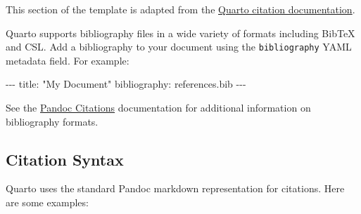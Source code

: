\documentclass[
  letterpaper,
  12pt,
  oneside,
  spanish,
  doublespacing,
  headsepline,
  parskip]{MastersDoctoralThesis}
\newenvironment{Shaded}{\begin{snugshade}}{\end{snugshade}}
\newcommand{\AttributeTok}[1]{\textcolor[rgb]{0.40,0.45,0.13}{#1}}
\newcommand{\FunctionTok}[1]{\textcolor[rgb]{0.28,0.35,0.67}{#1}}
\newcommand{\KeywordTok}[1]{\textcolor[rgb]{0.00,0.23,0.31}{#1}}
\newcommand{\PreprocessorTok}[1]{\textcolor[rgb]{0.68,0.00,0.00}{#1}}
\newcommand{\StringTok}[1]{\textcolor[rgb]{0.13,0.47,0.30}{#1}}
\begin{document}
This section of the template is adapted from the
\href{https://quarto.org/docs/authoring/footnotes-and-citations.html}{Quarto
citation documentation}.

Quarto supports bibliography files in a wide variety of formats
including BibTeX and CSL. Add a bibliography to your document using the
\texttt{bibliography} YAML metadata field. For example:

\begin{Shaded}
\begin{Highlighting}[]
\PreprocessorTok{{-}{-}{-}}
\FunctionTok{title}\KeywordTok{:}\AttributeTok{ }\StringTok{"My Document"}
\FunctionTok{bibliography}\KeywordTok{:}\AttributeTok{ references.bib}
\PreprocessorTok{{-}{-}{-}}
\end{Highlighting}
\end{Shaded}

See the \href{https://pandoc.org/MANUAL.html\#citations}{Pandoc
Citations} documentation for additional information on bibliography
formats.

\hypertarget{sec-citations}{%
\subsection{Citation Syntax}\label{sec-citations}}

Quarto uses the standard Pandoc markdown representation for citations.
Here are some examples:
\end{document}
